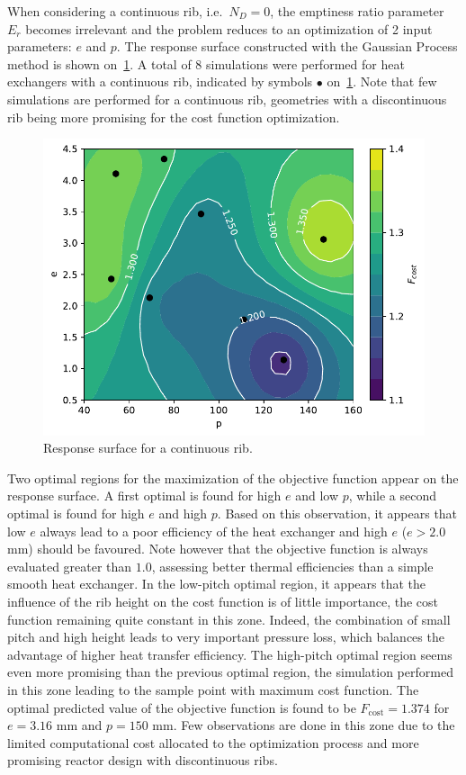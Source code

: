 When considering a continuous rib, i.e.~$N_D=0$, the emptiness ratio parameter $E_r$ becomes irrelevant and the problem reduces to an optimization of 2 input parameters: $e$ and $p$. The response surface constructed with the Gaussian Process method is shown on~\cref{continuous_RS}. A total of 8 simulations were performed for heat exchangers with a continuous rib, indicated by symbols $\bullet$ on~\cref{continuous_RS}. Note that few simulations are performed for a continuous rib, geometries with a discontinuous rib being more promising for the cost function optimization.\\

\begin{figure}[h]
\centering
\includegraphics[width=0.7\linewidth,keepaspectratio]{fig/applications/optim/GP_continuous.pdf}
\caption{Response surface for a continuous rib.}
\label{continuous_RS}
\end{figure}

Two optimal regions for the maximization of the objective function appear on the response surface. A first optimal is found for high $e$ and low $p$, while a second optimal is found for high $e$ and high $p$. Based on this observation, it appears that low $e$ always lead to a poor efficiency of the heat exchanger and high $e$ ($e > 2.0$ mm) should be favoured. Note however that the objective function is always evaluated greater than $1.0$, assessing better thermal efficiencies than a simple smooth heat exchanger. In the low-pitch optimal region, it appears that the influence of the rib height on the cost function is of little importance, the cost function remaining quite constant in this zone. Indeed, the combination of small pitch and high height leads to very important pressure loss, which balances the advantage of higher heat transfer efficiency. The high-pitch optimal region seems even more promising than the previous optimal region, the simulation performed in this zone leading to the sample point with maximum cost function. The optimal predicted value of the objective function is found to be $F_{\text{cost}} = 1.374$ for $e = 3.16$ mm and $p = 150$ mm. Few observations are done in this zone due to the limited computational cost allocated to the optimization process and more promising reactor design with discontinuous ribs.\\

